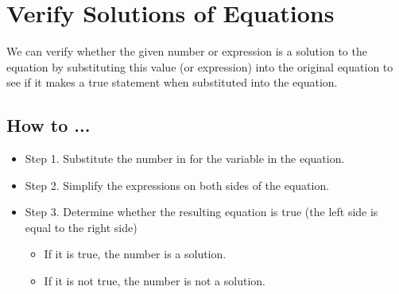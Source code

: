 \section{Verify Solutions of Equations}
We can verify whether the given number or expression is a solution to the equation by substituting this value (or expression) into the original equation to see if it makes a true statement when substituted into the equation.
\subsection{How to ... }
\begin{itemize}
    \item Step 1. Substitute the number in for the variable in the equation. 
    \item Step 2. Simplify the expressions on both sides of the equation. 
    \item Step 3. Determine whether the resulting equation is true (the left side is equal to the right side)
    \begin{itemize}
        \item If it is true, the number is a solution.
        \item If it is not true, the number is not a solution.
    \end{itemize} 
\end{itemize}

